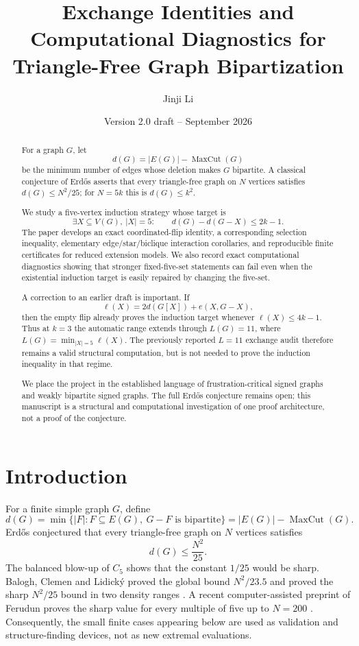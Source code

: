 \documentclass[11pt]{article}
\title{Exchange Identities and Computational Diagnostics for Triangle-Free Graph Bipartization}
\author{Jinji Li}
\date{Version 2.0 draft -- September 2026}
\newcommand{\mc}{\operatorname{MaxCut}}
\newcommand{\dd}{d}
\begin{document}
\maketitle

\begin{abstract}
For a graph $G$, let
\[
\dd(G)=|E(G)|-\mc(G)
\]
be the minimum number of edges whose deletion makes $G$ bipartite.
A classical conjecture of Erd\H{o}s asserts that every triangle-free graph
on $N$ vertices satisfies $\dd(G)\le N^2/25$; for $N=5k$ this is
$\dd(G)\le k^2$.

We study a five-vertex induction strategy whose target is
\[
\exists X\subseteq V(G),\ |X|=5:\qquad
\dd(G)-\dd(G-X)\le 2k-1.
\]
The paper develops an exact coordinated-flip identity, a corresponding
selection inequality, elementary edge/star/biclique interaction
corollaries, and reproducible finite certificates for reduced extension
models.  We also record exact computational diagnostics showing that
stronger fixed-five-set statements can fail even when the existential
induction target is easily repaired by changing the five-set.

A correction to an earlier draft is important.  If
\[
\ell(X)=2\dd(G[X])+e(X,G-X),
\]
then the empty flip already proves the induction target whenever
$\ell(X)\le 4k-1$.  Thus at $k=3$ the automatic range extends through
$L(G)=11$, where $L(G)=\min_{|X|=5}\ell(X)$.  The previously reported
$L=11$ exchange audit therefore remains a valid structural computation,
but is not needed to prove the induction inequality in that regime.

We place the project in the established language of frustration-critical
signed graphs and weakly bipartite signed graphs.  The full Erd\H{o}s
conjecture remains open; this manuscript is a structural and computational
investigation of one proof architecture, not a proof of the conjecture.
\end{abstract}

\section{Introduction}

For a finite simple graph $G$, define
\[
\dd(G)=\min\{|F|:F\subseteq E(G),\ G-F\text{ is bipartite}\}
      =|E(G)|-\mc(G).
\]
Erd\H{o}s conjectured that every triangle-free graph on $N$ vertices
satisfies
\[
\dd(G)\le \frac{N^2}{25}.
\]
The balanced blow-up of $C_5$ shows that the constant $1/25$ would be
sharp. Balogh, Clemen and Lidick\'y proved the global bound $N^2/23.5$
and proved the sharp $N^2/25$ bound in two density ranges
\cite{BCL}.  A recent computer-assisted preprint of Ferudun proves the
sharp value for every multiple of five up to $N=200$ \cite{Ferudun}.
Consequently, the small finite cases appearing below are used as
validation and structure-finding devices, not as new extremal evaluations.
\end{document}
